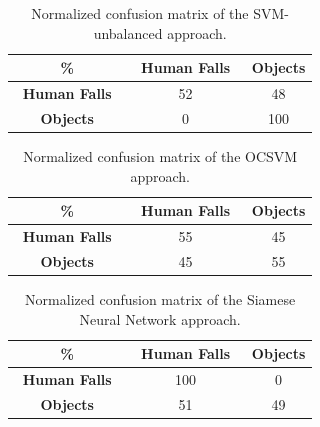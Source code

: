 \begin{table}[ht]
	\caption{Normalized confusion matrix of the SVM-unbalanced approach.}
	\label{tab:cm_svmo}
	\begin{center}
		
		\begin{tabular}[ht]{c|c|c}	
			\hline
			\textbf{\%} & \textbf{$\,$ Human Falls $\,$ } & \textbf{Objects} \\ %
			
			\hline
			\textbf{$\,$ Human Falls $\,$ }     			& 52    &   48     \\
			\textbf{Objects} 								& 0    &   100     	\\
			\hline
		\end{tabular}
	\end{center}
\end{table}
\begin{table}[ht]
	\caption{Normalized confusion matrix of the OCSVM approach.}
	\label{tab:cm_ocsvm}
	\begin{center}
		
		\begin{tabular}[ht]{c|c|c}	
			\hline
			\textbf{\%} & \textbf{$\,$ Human Falls $\,$ } & \textbf{Objects} \\ %
			
			\hline
			\textbf{$\,$ Human Falls $\,$ }     			& 55    &   45     \\
			\textbf{Objects} 								& 45    &   55     \\
			\hline
		\end{tabular}
	\end{center}
\end{table}
\begin{table}[ht]
	\caption{Normalized confusion matrix of the Siamese Neural Network approach.}
	\label{tab:cm_siamese}
	\begin{center}
		\begin{tabular}[ht]{c|c|c}	
			\hline
			\textbf{\%} & \textbf{$\,$ Human Falls $\,$ } & \textbf{Objects} \\ %
			\hline
			\textbf{$\,$ Human Falls $\,$ }     			& 100    &   0     \\
			\textbf{Objects} 								& 51     &   49    \\
			\hline
		\end{tabular}
	\end{center}
\end{table}

